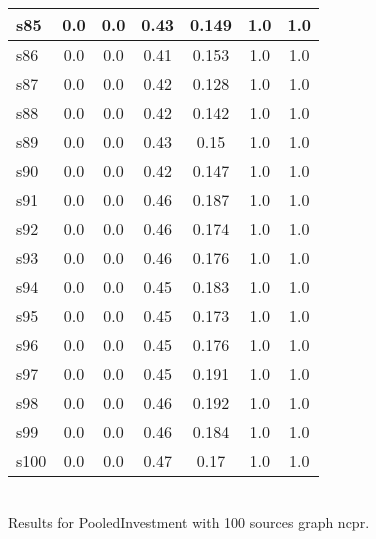 \documentclass{article}
\begin{document}
\begin{tabular}{|l|c|c|c|c|c|c|}
\hline
s85 &0.0 & 0.0 & 0.43 & 0.149 & 1.0 & 1.0\\
\hline
s86 &0.0 & 0.0 & 0.41 & 0.153 & 1.0 & 1.0\\
\hline
s87 &0.0 & 0.0 & 0.42 & 0.128 & 1.0 & 1.0\\
\hline
s88 &0.0 & 0.0 & 0.42 & 0.142 & 1.0 & 1.0\\
\hline
s89 &0.0 & 0.0 & 0.43 & 0.15 & 1.0 & 1.0\\
\hline
s90 &0.0 & 0.0 & 0.42 & 0.147 & 1.0 & 1.0\\
\hline
s91 &0.0 & 0.0 & 0.46 & 0.187 & 1.0 & 1.0\\
\hline
s92 &0.0 & 0.0 & 0.46 & 0.174 & 1.0 & 1.0\\
\hline
s93 &0.0 & 0.0 & 0.46 & 0.176 & 1.0 & 1.0\\
\hline
s94 &0.0 & 0.0 & 0.45 & 0.183 & 1.0 & 1.0\\
\hline
s95 &0.0 & 0.0 & 0.45 & 0.173 & 1.0 & 1.0\\
\hline
s96 &0.0 & 0.0 & 0.45 & 0.176 & 1.0 & 1.0\\
\hline
s97 &0.0 & 0.0 & 0.45 & 0.191 & 1.0 & 1.0\\
\hline
s98 &0.0 & 0.0 & 0.46 & 0.192 & 1.0 & 1.0\\
\hline
s99 &0.0 & 0.0 & 0.46 & 0.184 & 1.0 & 1.0\\
\hline
s100 &0.0 & 0.0 & 0.47 & 0.17 & 1.0 & 1.0\\
\hline
\end{tabular}\\

\noindent Results for PooledInvestment with 100 sources graph ncpr.
\end{document}
